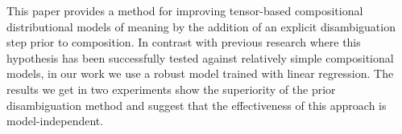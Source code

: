 This paper provides a method for improving tensor-based compositional distributional models of meaning by the addition of an explicit disambiguation step prior to composition. In contrast with previous research where this hypothesis has been successfully tested against relatively simple compositional models, in our work we use a robust model trained with linear regression. The results we get in two experiments show the superiority of the prior disambiguation method and suggest that the effectiveness of this approach is model-independent.
